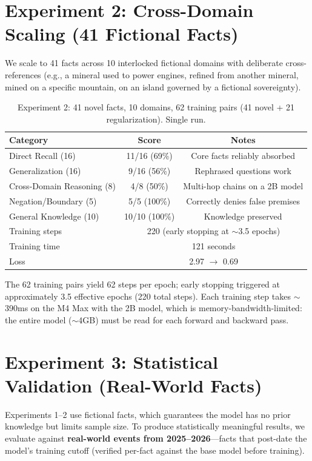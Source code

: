 \documentclass[11pt,a4paper]{article}
\begin{document}
\section{Experiment 2: Cross-Domain Scaling (41 Fictional Facts)}

We scale to 41 facts across 10 interlocked fictional domains with deliberate cross-references (e.g., a mineral used to power engines, refined from another mineral, mined on a specific mountain, on an island governed by a fictional sovereignty).

\begin{table}[H]
\centering
\caption{Experiment 2: 41 novel facts, 10 domains, 62 training pairs (41 novel + 21 regularization). Single run.}
\label{tab:exp2}
\begin{tabular}{lcc}
\toprule
\textbf{Category} & \textbf{Score} & \textbf{Notes} \\
\midrule
Direct Recall (16) & 11/16 (69\%) & Core facts reliably absorbed \\
Generalization (16) & 9/16 (56\%) & Rephrased questions work \\
Cross-Domain Reasoning (8) & 4/8 (50\%) & Multi-hop chains on a 2B model \\
Negation/Boundary (5) & 5/5 (100\%) & Correctly denies false premises \\
General Knowledge (10) & 10/10 (100\%) & Knowledge preserved \\
\midrule
Training steps & \multicolumn{2}{c}{220 (early stopping at $\sim$3.5 epochs)} \\
Training time & \multicolumn{2}{c}{121 seconds} \\
Loss & \multicolumn{2}{c}{2.97 $\rightarrow$ 0.69} \\
\bottomrule
\end{tabular}
\end{table}

The 62 training pairs yield 62 steps per epoch; early stopping triggered at approximately 3.5 effective epochs (220 total steps). Each training step takes $\sim$390ms on the M4 Max with the 2B model, which is memory-bandwidth-limited: the entire model ($\sim$4GB) must be read for each forward and backward pass.

\section{Experiment 3: Statistical Validation (Real-World Facts)}
\label{sec:stat}

Experiments 1--2 use fictional facts, which guarantees the model has no prior knowledge but limits sample size. To produce statistically meaningful results, we evaluate against \textbf{real-world events from 2025--2026}---facts that post-date the model's training cutoff (verified per-fact against the base model before training).
\end{document}

